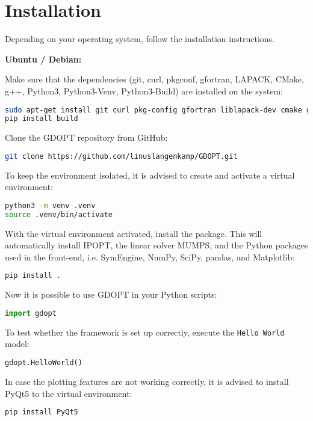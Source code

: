 \documentclass[12pt]{article}
\begin{document}
\section{Installation}

Depending on your operating system, follow the installation instructions.

\begin{mdframed}[backgroundcolor=gray!10, roundcorner=10pt,
		linewidth=1pt]

	\textbf{Ubuntu / Debian:}

	Make sure that the dependencies (git, curl, pkgconf, gfortran, LAPACK, CMake, g++,
	Python3, Python3-Venv, Python3-Build) are installed on the system:

\begin{lstlisting}[language=bash]
sudo apt-get install git curl pkg-config gfortran liblapack-dev cmake g++ python3 python3-venv
pip install build
\end{lstlisting}

Clone the GDOPT repository from GitHub:

\begin{lstlisting}[language=bash]
git clone https://github.com/linuslangenkamp/GDOPT.git
\end{lstlisting}

	To keep the environment isolated, it is advised to create and activate a
	virtual environment:

	\begin{lstlisting}[language=bash]
python3 -m venv .venv
source .venv/bin/activate
\end{lstlisting}

	With the virtual environment activated, install the package. This will
	automatically install
	IPOPT\cite{wachter2006implementation}, the linear solver
	MUMPS\cite{amestoy2001fully}, and the Python packages used in the front-end,
	i.e. SymEngine\cite{symengine}, NumPy\cite{harris2020array},
	SciPy\cite{virtanen2020scipy}, pandas\cite{mckinney2010data}, and
	Matplotlib\cite{hunter2007matplotlib}:

\begin{lstlisting}[language=bash]
pip install .
\end{lstlisting}

Now it is possible to use GDOPT in your Python scripts:
\begin{lstlisting}[language=python]
import gdopt
\end{lstlisting}

To test whether the framework is set up correctly, execute the \texttt{Hello World} model:
\begin{lstlisting}[language=python]
gdopt.HelloWorld()
\end{lstlisting}

In case the plotting features are not working correctly, it is advised to install PyQt5 to the virtual environment:

\begin{lstlisting}[language=bash]
pip install PyQt5
\end{lstlisting}

\end{mdframed}
\end{document}
